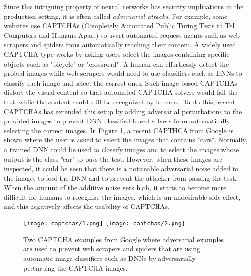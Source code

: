 Since this intriguing property of neural networks has security implications in the production setting, it is often called \textit{adversarial attacks}. For example, some websites use CAPTCHAs (Completely Automated Public Turing Tests to Tell Computers and Humans Apart) to avert automated request agents such as web scrapers and spiders from automatically reaching their content. A widely used CAPTCHA type works by asking users select the images containing specific objects such as "bicycle" or "crossroad". A human can effortlessly detect the probed images while web scrapers would need to use classifiers such as DNNs to classify each image and select the correct ones. Such image based CAPTCHAs distort the visual content so that automated CAPTCHA solvers would fail the test, while the content could still be recognized by humans. To do this, recent CAPTCHAs has extended this setup by adding adversarial perturbations to the provided images to prevent DNN classified based solvers from automatically selecting the correct images. In Figure \ref{fig:googlecaptcha}, a recent CAPTHCA from Google is shown where the user is asked to select the images that contains "cars". Normally, a trained DNN could be used to classify images and to select the images whose output is the class "car" to pass the test. However, when these images are inspected, it could be seen that there is a noticeable adversarial noise added to the images to fool the DNN and to prevent the attacker from passing the test. When the amount of the additive noise gets high, it starts to become more difficult for humans to recognize the images, which is an undesirable side effect, and this negatively affects the usability of CAPTCHAs.
\begin{figure}[t]
    \centering
    \texttt{[image: captchas/1.png]}
    \texttt{[image: captchas/2.png]}
    \caption[Adversarially perturbed visual CAPTCHA examples.]{ Two CAPTCHA examples from Google where adversarial examples are used to prevent web scrapers and spiders that are using automatic image classifiers such as DNNs by adversarially perturbing the CAPTCHA images.}\label{fig:googlecaptcha}
\end{figure}

